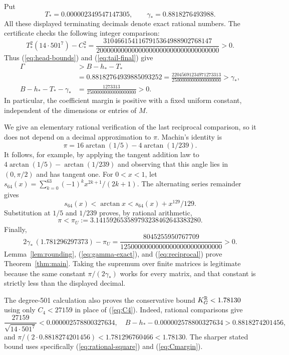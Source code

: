 Put
\[
 T_*=0.000002349547147305,\qquad \gamma_*=0.8818276493988.
\]
All these displayed terminating decimals denote exact rational numbers.
The certificate checks the following integer comparison:
\begin{equation}\label{eq:tail-rational}
 T_*^2(14\cdot501^7)-C_*^2
 =\frac{3104661541167915364988902768147}
        {20000000000000000000000000000000000}>0.
\end{equation}
Thus (\ref{eq:head-bounds}) and (\ref{eq:tail-final}) give
\begin{align}
 \Gamma
 &> B-h_*-T_*\nonumber\\
 &=0.88182764939885093252
   =\frac{22045691234971273313}{25000000000000000000}
   >\gamma_*,\label{eq:gamma-exact}\\
 B-h_*-T_*-\gamma_*
 &=\frac{1273313}{25000000000000000000}>0.\nonumber
\end{align}
In particular, the coefficient margin is positive with a fixed uniform
constant, independent of the dimensions or entries of $M$.

We give an elementary rational verification of the last reciprocal
comparison, so it does not depend on a decimal approximation to $\pi$.
Machin's identity is
\[
 \pi=16\arctan(1/5)-4\arctan(1/239).
\]
It follows, for example, by applying the tangent addition law to
$4\arctan(1/5)-\arctan(1/239)$ and observing that this angle lies in
$(0,\pi/2)$ and has tangent one. For $0<x<1$, let
$s_{64}(x)=\sum_{k=0}^{63}(-1)^kx^{2k+1}/(2k+1)$. The alternating
series remainder gives
\[
 s_{64}(x)<\arctan x<s_{64}(x)+x^{129}/129.
\]
Substitution at $1/5$ and $1/239$ proves, by rational arithmetic,
\[
 \pi<\pi_U:=3.141592653589793238462643383280.
\]
Finally,
\begin{equation}\label{eq:reciprocal}
 2\gamma_*\,(1.781296297373)-\pi_U
 =\frac{8045255950767709}{12500000000000000000000000000}>0.
\end{equation}
Lemma~\ref{lem:rounding}, (\ref{eq:gamma-exact}), and
(\ref{eq:reciprocal}) prove Theorem~\ref{thm:main}. Taking the supremum
over finite matrices is legitimate because the same constant
$\pi/(2\gamma_*)$ works for every matrix, and that constant is strictly
less than the displayed decimal.

The degree-501 calculation also proves the conservative bound
$K_G^{\mathbb R}<1.78130$ using only $C_4<27159$ in place of
(\ref{eq:C4}). Indeed, rational comparisons give
\[
 \frac{27159}{\sqrt{14\cdot501^7}}<0.000002578800327634,
 \quad B-h_*-0.000002578800327634>0.8818274201456,
\]
and $\pi/(2\cdot0.8818274201456)<1.781296760466<1.78130$.
The sharper stated bound uses specifically (\ref{eq:rational-square})
and (\ref{eq:Cmargin}).
